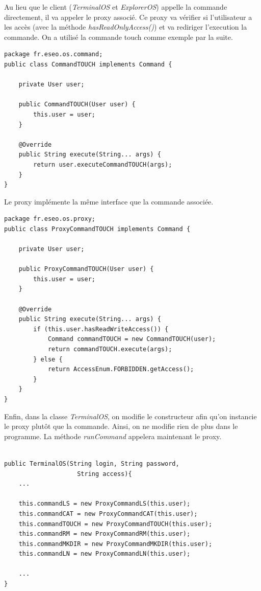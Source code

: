 Au lieu que le client (\emph{TerminalOS} et \emph{ExplorerOS}) appelle la commande directement, il va appeler le proxy associé. Ce proxy va vérifier si l'utilisateur a les accès (avec la méthode \emph{hasReadOnlyAccess()}) et va rediriger l'execution la commande. On a utilisé la commande touch comme exemple par la suite.

\begin{lstlisting}
package fr.eseo.os.command;
public class CommandTOUCH implements Command {

    private User user;

    public CommandTOUCH(User user) {
        this.user = user;
    }

    @Override
    public String execute(String... args) {
        return user.executeCommandTOUCH(args);
    }
}
\end{lstlisting}

Le proxy implémente la même interface que la commande associée.

\begin{lstlisting}
package fr.eseo.os.proxy;
public class ProxyCommandTOUCH implements Command {

    private User user;

    public ProxyCommandTOUCH(User user) {
        this.user = user;
    }

    @Override
    public String execute(String... args) {
        if (this.user.hasReadWriteAccess()) {
            Command commandTOUCH = new CommandTOUCH(user);
            return commandTOUCH.execute(args);
        } else {
            return AccessEnum.FORBIDDEN.getAccess();
        }
    }
}
\end{lstlisting}

Enfin, dans la classe \emph{TerminalOS}, on modifie le constructeur afin qu'on instancie le proxy plutôt que la commande. Ainsi, on ne modifie rien de plus dans le programme. La méthode \emph{runCommand} appelera maintenant le proxy.

\clearpage
\begin{lstlisting}

public TerminalOS(String login, String password, 
					String access){
	...

	this.commandLS = new ProxyCommandLS(this.user);
	this.commandCAT = new ProxyCommandCAT(this.user);
	this.commandTOUCH = new ProxyCommandTOUCH(this.user);
	this.commandRM = new ProxyCommandRM(this.user);
	this.commandMKDIR = new ProxyCommandMKDIR(this.user);
	this.commandLN = new ProxyCommandLN(this.user);

	...
}
\end{lstlisting}

